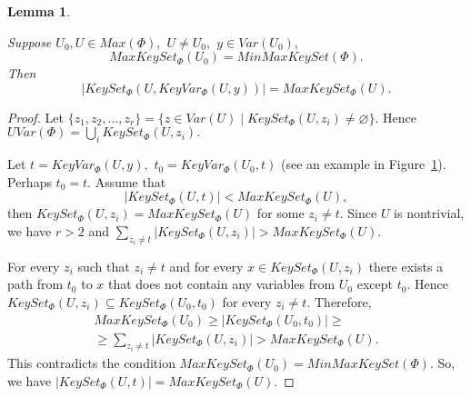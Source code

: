 \documentclass{au}
\theoremstyle{plain}
\newtheorem{lemma}{Lemma}
\theoremstyle{definition}
\theoremstyle{remark}
\numberwithin{equation}{section}
\begin{document}
\begin{lemma}\label{minmaxkeyset}

Suppose $U_{0},U\in Max(\Phi),$ $U\neq U_{0},$
$y \in Var(U_{0}),$
$$MaxKeySet_{\Phi}(U_{0})=MinMaxKeySet(\Phi).$$
Then $$|KeySet_{\Phi}(U,KeyVar_{\Phi}(U,y))| = MaxKeySet_{\Phi}(U).$$

\end{lemma}

\begin{proof}

Let $\{z_{1},z_{2},\ldots,z_{r}\} = \{z\in Var(U) \;|\; KeySet_{\Phi}(U,z_{i})\neq \varnothing\}.$
Hence $UVar(\Phi) = \bigcup \limits_{i} KeySet_{\Phi}(U,z_{i}).$

\begin{figure}
\centerline{
}
\caption{}\label{TwoUnions}
\end{figure}

Let $t = KeyVar_{\Phi}(U,y),$
$t_{0} = KeyVar_{\Phi}(U_{0},t)$
(see an example in Figure~\ref{TwoUnions}).
Perhaps $t_{0} = t.$
Assume that $$|KeySet_{\Phi}(U,t)| < MaxKeySet_{\Phi}(U),$$
then $KeySet_{\Phi}(U,z_{i})= MaxKeySet_{\Phi}(U)$ for some $z_{i}\neq t.$
Since $U$ is nontrivial, we have $r>2$ and
$\sum\limits_{z_{i}\neq t} |KeySet_{\Phi}(U,z_{i})|> MaxKeySet_{\Phi}(U).$

For every $z_{i}$ such that $z_{i}\neq t$
and for every $x\in KeySet_{\Phi}(U,z_{i})$
there exists a path from $t_{0}$ to $x$ that does not contain any variables from $U_{0}$ except $t_{0}.$
Hence $KeySet_{\Phi}(U,z_{i})\subseteq KeySet_{\Phi}(U_{0},t_{0})$ for every $z_{i}\neq t.$ Therefore,
\begin{multline*}MaxKeySet_{\Phi}(U_{0})\ge |KeySet_{\Phi}(U_{0},t_{0})|\ge \\ \ge
\sum\limits_{z_{i}\neq t} |KeySet_{\Phi}(U,z_{i})|> MaxKeySet_{\Phi}(U).\end{multline*}
This contradicts the condition $MaxKeySet_{\Phi}(U_{0})=MinMaxKeySet(\Phi).$
So, we have $|KeySet_{\Phi}(U,t)| = MaxKeySet_{\Phi}(U).$

\end{proof}
\end{document}
